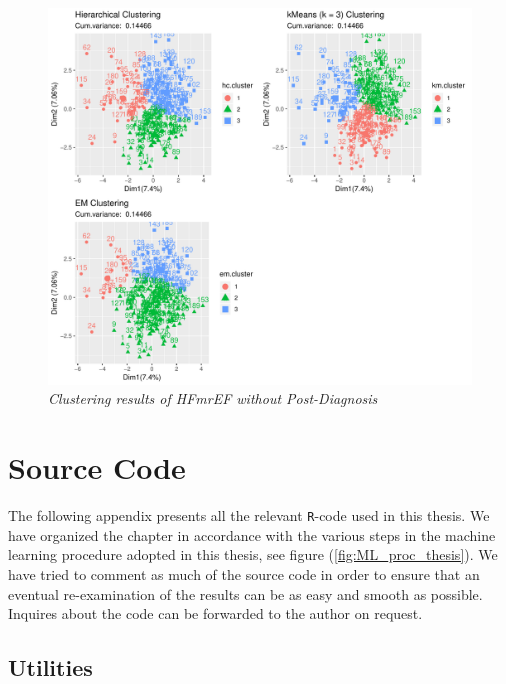 \documentclass[../thesis.tex]{subfiles}
\begin{document}
\newpage

\begin{figure}[h!]
    \centering
    \hspace*{-1cm}\includegraphics[width=1.1\textwidth]{doc/thesis/images/ClustmrNoPhy.pdf}
    \caption[Clustering results: HFmrEF without Post-Diagnosis]{\textit{Clustering results of HFmrEF \textit{without} Post-Diagnosis}}
    \label{fig:clust_results_without_post_mr}
\end{figure}

\chapter{Source Code}
\label{chap:souce_code}

\noindent The following appendix presents all the relevant \texttt{R}-code used in this thesis. We have organized the chapter in accordance with the various steps in the machine learning procedure adopted in this thesis, see figure (\ref{fig:ML_proc_thesis}). We have tried to comment as much of the source code in order to ensure that an eventual re-examination of the results can be as easy and smooth as possible. Inquires about the code can be forwarded to the author on request.

\section{Utilities}
\label{sec:utilities}
\end{document}
